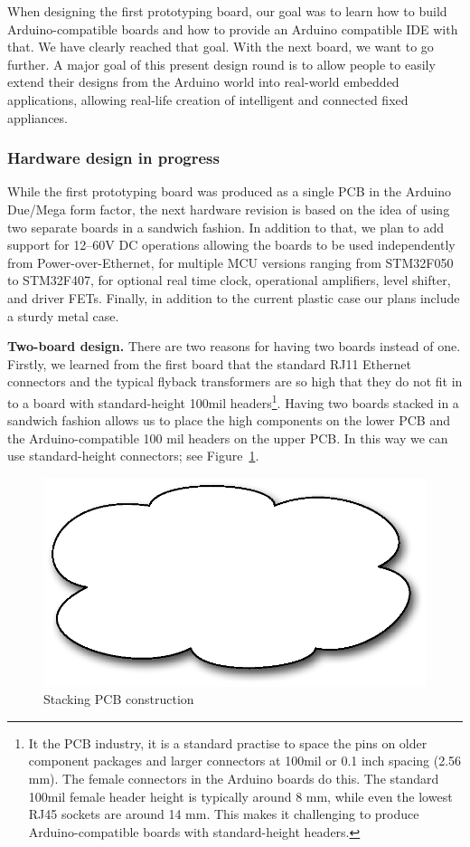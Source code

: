 \documentclass[final]{siamltex}
\begin{document}
When designing the first prototyping board, our goal was to learn how
to build Arduino-compatible boards and how to provide an Arduino
compatible IDE with that.  We have clearly reached that goal.  With
the next board, we want to go further.  A major goal of this present
design round is to allow people to easily extend their designs from
the Arduino world into real-world embedded applications, allowing
real-life creation of intelligent and connected fixed appliances.

\subsubsection{Hardware design in progress}

While the first prototyping board was produced as a single PCB in the
Arduino Due/Mega form factor, the next hardware revision is based on
the idea of using two separate boards in a sandwich fashion.  In
addition to that, we plan to add support for 12--60V DC operations allowing
the boards to be used independently from Power-over-Ethernet, for
multiple MCU versions ranging from STM32F050 to STM32F407, for
optional real time clock, operational amplifiers, level shifter, and
driver FETs.  Finally, in addition to the current plastic case our
plans include a sturdy metal case.

{\bf Two-board design.}
There are two reasons for having two boards instead of one.  Firstly,
we learned from the first board that the standard RJ11 Ethernet
connectors and the typical flyback transformers are so high that they
do not fit in to a board with standard-height 100mil
headers\footnote{It the PCB industry, it is a standard practise to
  space the pins on older component packages and larger connectors at
  100mil or 0.1 inch spacing (2.56 mm).  The female connectors in the Arduino
  boards do this.  The standard 100mil female header height is
  typically around 8 mm, while even the lowest RJ45 sockets
  are around 14 mm.  This makes it challenging to produce
  Arduino-compatible boards with standard-height headers.}.
Having two boards stacked in a sandwich fashion allows us to place the
high components on the lower PCB and the Arduino-compatible 100 mil
headers on the upper PCB.  In this way we can use standard-height
connectors; see Figure~\ref{fig:stacking}.

\begin{figure}
\centering
\includegraphics[scale=.4]{figure-stacking.eps}
\caption{Stacking PCB construction}
\label{fig:stacking}
\end{figure}
\end{document}
